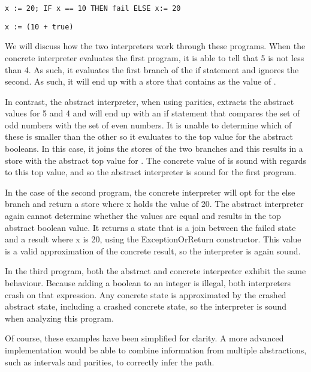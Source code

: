 \begin{lstlisting}
x := 20; IF x == 10 THEN fail ELSE x:= 20
\end{lstlisting}

\begin{lstlisting}
x := (10 + true)
\end{lstlisting}

We will discuss how the two interpreters work through these programs. When the
concrete interpreter evaluates the first program, it is able to tell that 5 is
not less than 4. As such, it evaluates the first branch of the if statement and
ignores the second. As such, it will end up with a store that contains
 as the value of .

In contrast, the abstract interpreter, when using parities, extracts the 
abstract values for 5 and 4
and will end up with an if statement that compares the set of odd numbers with
the set of even numbers. It is unable to determine which of these is smaller
than the other so it evaluates to the top value for the abstract booleans. In
this case, it joins the stores of the two branches and this results in a store
with the abstract top value for . The concrete value of  is
sound with regards to this top value, and so the abstract interpreter is sound
for the first program.

In the case of the second program, the concrete interpreter will opt for the
else branch and return a store where x holds the value of 20. The abstract
interpreter again cannot determine whether the values are equal and results in
the top abstract boolean value. It returns a state that is a join between the
failed state and a result where x is 20, using the ExceptionOrReturn
constructor. This value is a valid approximation of the concrete result, so the
interpreter is again sound.

In the third program, both the abstract and concrete interpreter exhibit the
same behaviour. Because adding a boolean to an integer is illegal, both
interpreters crash on that expression. Any concrete state is approximated by
the crashed abstract state, including a crashed concrete state, so the
interpreter is sound when analyzing this program.

Of course, these examples have been simplified for clarity. A more advanced
implementation would be able to combine information from multiple abstractions,
such as intervals and parities, to correctly infer the path. 

